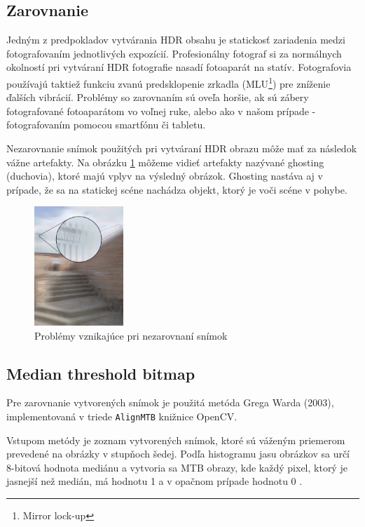 \subsection{Zarovnanie}
\label{sec:Practice-Alignment}

Jedným z predpokladov vytvárania HDR obsahu je statickosť zariadenia medzi fotografovaním jednotlivých expozícií.
Profesionálny fotograf si za normálnych okolností pri vytváraní HDR fotografie nasadí fotoaparát na statív.
Fotografovia používajú taktiež funkciu zvanú predsklopenie zrkadla (MLU\footnote{Mirror lock-up}) pre zníženie 
ďalších vibrácií. Problémy so zarovnaním sú oveľa horšie, ak sú zábery fotografované fotoaparátom vo voľnej ruke, 
alebo ako v našom prípade - fotografovaním pomocou smartfónu či tabletu.

Nezarovnanie snímok použitých pri vytváraní HDR obrazu môže mať za následok vážne artefakty. Na obrázku
\ref{fig:unaligned} môžeme vidieť artefakty nazývané ghosting (duchovia), ktoré majú vplyv na výsledný
obrázok. Ghosting nastáva aj v prípade, že sa na statickej scéne nachádza objekt, ktorý je voči scéne v pohybe.

\begin{figure}[h!]
    \centering
    \includegraphics[width=0.3\textwidth]{figures/capturing/align/unaligned}
    \caption{Problémy vznikajúce pri nezarovnaní snímok}
    \label{fig:unaligned}
\end{figure}

\subsection*{Median threshold bitmap}

Pre zarovnanie vytvorených snímok je použitá metóda Grega Warda (2003), implementovaná v triede
\texttt{AlignMTB} knižnice OpenCV.

Vstupom metódy je zoznam vytvorených snímok, ktoré sú váženým priemerom prevedené na obrázky v stupňoch šedej.
Podľa histogramu jasu obrázkov sa určí 8-bitová hodnota mediánu a vytvoria sa MTB obrazy, kde každý pixel, ktorý 
je jasnejší než medián, má hodnotu 1 a v opačnom prípade hodnotu 0 \cite{Align}.

